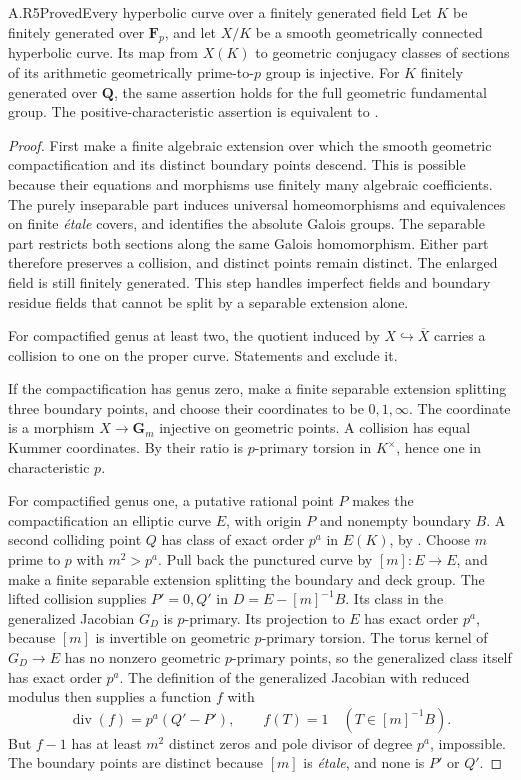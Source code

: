 \begin{claim}{A.R5}{Proved}{Every hyperbolic curve over a finitely generated field}
Let $K$ be finitely generated over $\mathbf F_p$, and let $X/K$ be
a smooth geometrically connected hyperbolic curve. Its map from
$X(K)$ to geometric conjugacy classes of sections of its arithmetic
geometrically prime-to-$p$ group is injective. For $K$ finitely
generated over $\mathbf Q$, the same assertion holds for the full
geometric fundamental group. The positive-characteristic assertion
is equivalent to .
\end{claim}
\begin{proof}
First make a finite algebraic extension over which the smooth
geometric compactification and its distinct boundary points descend.
This is possible because their equations and morphisms use finitely
many algebraic coefficients. The purely inseparable part induces
universal homeomorphisms and equivalences on finite \emph{\'{e}tale}
covers, and identifies the absolute Galois groups. The separable part
restricts both sections along the same Galois homomorphism. Either
part therefore preserves a collision, and distinct points remain
distinct. The enlarged field is still finitely generated. This step
handles imperfect fields and boundary residue fields that cannot be
split by a separable extension alone.

For compactified genus at least two, the quotient induced by
$X\hookrightarrow\overline X$ carries a collision to one on the
proper curve. Statements  and
 exclude it.

If the compactification has genus zero, make a finite separable
extension splitting three boundary points, and choose their
coordinates to be $0,1,\infty$. The coordinate is a morphism
$X\to\mathbf G_m$ injective on geometric points. A collision
has equal Kummer coordinates. By  their ratio
is $p$-primary torsion in $K^\times$, hence one in characteristic $p$.

For compactified genus one, a putative rational point $P$ makes
the compactification an elliptic curve $E$, with origin $P$ and
nonempty boundary $B$. A second colliding point $Q$ has class of
exact order $p^a$ in $E(K)$, by . Choose $m$
prime to $p$ with $m^2>p^a$. Pull back the punctured curve by
$[m]:E\to E$, and make a finite separable extension splitting the
boundary and deck group. The lifted collision supplies $P'=0,Q'$
in $D=E-[m]^{-1}B$. Its class in the generalized Jacobian $G_D$ is
$p$-primary. Its projection to $E$ has exact order $p^a$, because
$[m]$ is invertible on geometric $p$-primary torsion. The torus
kernel of $G_D\to E$ has no nonzero geometric $p$-primary points,
so the generalized class itself has exact order $p^a$.
The definition of the generalized Jacobian with reduced modulus
then supplies a function $f$ with
\[
 \operatorname{div}(f)=p^a(Q'-P'),\qquad
 f(T)=1\quad(T\in[m]^{-1}B).
\]
But $f-1$ has at least $m^2$ distinct zeros and pole divisor of
degree $p^a$, impossible. The boundary points are distinct because
$[m]$ is \emph{\'etale}, and none is $P'$ or $Q'$.


\end{proof}
